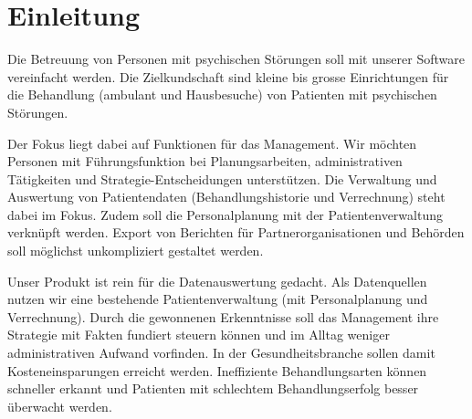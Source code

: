 \documentclass[a4paper]{scrreprt}
\begin{document}
\chapter{Einleitung}

Die Betreuung von Personen mit psychischen Störungen soll mit unserer Software vereinfacht werden. Die Zielkundschaft sind kleine bis grosse Einrichtungen für die Behandlung (ambulant und Hausbesuche) von Patienten mit psychischen Störungen.

Der Fokus liegt dabei auf Funktionen für das Management. Wir möchten Personen mit Führungsfunktion bei Planungsarbeiten, administrativen Tätigkeiten und Strategie-Entscheidungen unterstützen. Die Verwaltung und Auswertung von Patientendaten (Behandlungshistorie und Verrechnung) steht dabei im Fokus. Zudem soll die Personalplanung mit der Patientenverwaltung verknüpft werden. Export von Berichten für Partnerorganisationen und Behörden soll möglichst unkompliziert gestaltet werden.

\bigskip

Unser Produkt ist rein für die Datenauswertung gedacht. Als Datenquellen nutzen wir eine bestehende Patientenverwaltung (mit Personalplanung und Verrechnung). Durch die gewonnenen Erkenntnisse soll das Management ihre Strategie mit Fakten fundiert steuern können und im Alltag weniger administrativen Aufwand vorfinden. In der Gesundheitsbranche sollen damit Kosteneinsparungen erreicht werden. Ineffiziente Behandlungsarten können schneller erkannt und Patienten mit schlechtem Behandlungserfolg besser überwacht werden.
\end{document}
